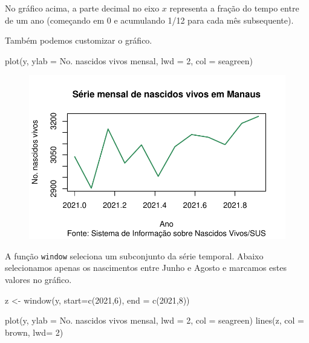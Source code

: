 \documentclass[
  letterpaper,
  DIV=11,
  numbers=noendperiod]{scrreprt}
\newenvironment{Shaded}{\begin{snugshade}}{\end{snugshade}}
\newcommand{\AttributeTok}[1]{\textcolor[rgb]{0.40,0.45,0.13}{#1}}
\newcommand{\DecValTok}[1]{\textcolor[rgb]{0.68,0.00,0.00}{#1}}
\newcommand{\FunctionTok}[1]{\textcolor[rgb]{0.28,0.35,0.67}{#1}}
\newcommand{\NormalTok}[1]{\textcolor[rgb]{0.00,0.23,0.31}{#1}}
\newcommand{\OtherTok}[1]{\textcolor[rgb]{0.00,0.23,0.31}{#1}}
\newcommand{\StringTok}[1]{\textcolor[rgb]{0.13,0.47,0.30}{#1}}
\begin{document}
No gráfico acima, a parte decimal no eixo \(x\) representa a fração do
tempo entre de um ano (começando em 0 e acumulando 1/12 para cada mês
subsequente).

Também podemos customizar o gráfico.

\begin{Shaded}
\begin{Highlighting}[]
\FunctionTok{plot}\NormalTok{(y, }\AttributeTok{ylab =} \StringTok{\textquotesingle{}No. nascidos vivos mensal\textquotesingle{}}\NormalTok{, }\AttributeTok{lwd =} \DecValTok{2}\NormalTok{, }\AttributeTok{col =} \StringTok{\textquotesingle{}seagreen\textquotesingle{}}\NormalTok{)}
\end{Highlighting}
\end{Shaded}

\begin{figure}[H]

{\centering \includegraphics{intro_files/figure-pdf/unnamed-chunk-3-1.pdf}

}

\end{figure}

A função \texttt{window} seleciona um subconjunto da série temporal.
Abaixo selecionamos apenas os nascimentos entre Junho e Agosto e
marcamos estes valores no gráfico.

\begin{Shaded}
\begin{Highlighting}[]
\NormalTok{z }\OtherTok{\textless{}{-}} \FunctionTok{window}\NormalTok{(y, }\AttributeTok{start=}\FunctionTok{c}\NormalTok{(}\DecValTok{2021}\NormalTok{,}\DecValTok{6}\NormalTok{), }\AttributeTok{end =} \FunctionTok{c}\NormalTok{(}\DecValTok{2021}\NormalTok{,}\DecValTok{8}\NormalTok{))}

\FunctionTok{plot}\NormalTok{(y, }\AttributeTok{ylab =} \StringTok{\textquotesingle{}No. nascidos vivos mensal\textquotesingle{}}\NormalTok{, }\AttributeTok{lwd =} \DecValTok{2}\NormalTok{, }\AttributeTok{col =} \StringTok{\textquotesingle{}seagreen\textquotesingle{}}\NormalTok{)}
\FunctionTok{lines}\NormalTok{(z, }\AttributeTok{col =} \StringTok{\textquotesingle{}brown\textquotesingle{}}\NormalTok{, }\AttributeTok{lwd=} \DecValTok{2}\NormalTok{)}
\end{Highlighting}
\end{Shaded}
\end{document}
